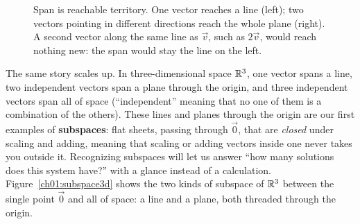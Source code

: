 \begin{figure}[H]
\centering
{}
\caption{Span is reachable territory. One vector reaches a line (left); two vectors pointing in different
directions reach the whole plane (right). A second vector along the same line as $\vec v$, such as
$2\vec v$, would reach nothing new: the span would stay the line on the left.}
\label{ch01:span}
\end{figure}

The same story scales up. In three-dimensional space $\mathbb{R}^3$, one vector spans a line, two independent vectors span a plane
through the origin, and three independent vectors span all of space (``independent'' meaning that no
one of them is a combination of the others). These lines and planes through
the origin are our first examples of \textbf{subspaces}: flat sheets, passing through $\vec 0$, that
are \emph{closed} under scaling and adding, meaning that scaling or adding vectors inside one never
takes you outside it. Recognizing subspaces will let
us answer ``how many solutions does this system have?'' with a glance instead of a calculation.
Figure~\ref{ch01:subspace3d} shows the two kinds of subspace of $\mathbb{R}^3$ between the single point
$\vec 0$ and all of space: a line and a plane, both
threaded through the origin.

